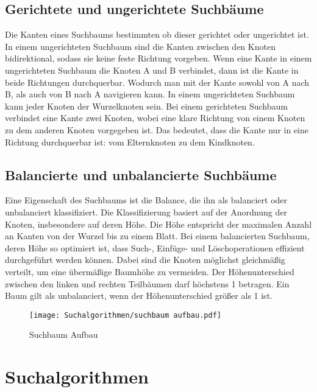 \subsection{Gerichtete und ungerichtete Suchb\"{a}ume} \label{gerichtete Graphen}
\label{chap:gerichtet und ungerichtete suchb\"{a}ume}

Die Kanten eines Suchbaums bestimmten ob dieser gerichtet oder ungerichtet ist. In einem ungerichteten Suchbaum sind die Kanten zwischen den Knoten bidirektional, sodass sie keine feste Richtung vorgeben. Wenn eine Kante in einem ungerichteten Suchbaum die Knoten A und B verbindet, dann ist die Kante in beide Richtungen durchquerbar. Wodurch man mit der Kante sowohl von A nach B, als auch von B nach A navigieren kann. In einem ungerichteten Suchbaum kann jeder Knoten der Wurzelknoten sein. Bei einem gerichteten Suchbaum verbindet eine Kante zwei Knoten, wobei eine klare Richtung von einem Knoten zu dem anderen Knoten vorgegeben ist. Das bedeutet, dass die Kante nur in eine Richtung durchquerbar ist: vom Elternknoten zu dem Kindknoten.

\subsection{Balancierte und unbalancierte Suchb\"{a}ume}
\label{chap:balancierte und unbalancierte suchb\"{a}ume}

Eine Eigenschaft des Suchbaums ist die Balance, die ihn als balanciert oder unbalanciert klassifiziert. Die Klassifizierung basiert auf der Anordnung der Knoten, insbesondere auf deren H\"{o}he. Die H\"{o}he entspricht der maximalen Anzahl an Kanten von der Wurzel bis zu einem Blatt. Bei einem balancierten Suchbaum, deren H\"{o}he so optimiert ist, dass Such-, Einf\"{u}ge- und L\"{o}schoperationen effizient durchgef\"{u}hrt werden k\"{o}nnen. Dabei sind die Knoten m\"{o}glichst gleichm\"{a}\ss{}ig verteilt, um eine \"{u}berm\"{a}\ss{}ige Baumh\"{o}he zu vermeiden. Der H\"{o}henunterschied zwischen den linken und rechten Teilb\"{a}umen darf h\"{o}chstens 1 betragen. Ein Baum gilt als unbalanciert, wenn der H\"{o}henunterschied gr\"{o}\ss{}er als 1 ist.

\begin{figure}[h]
  \centering
  \texttt{[image: Suchalgorithmen/suchbaum aufbau.pdf]}
	\captionsetup{justification=justified, format=plain}
  \caption{Suchbaum Aufbau}
  \label{fig:suchabaum aufbau}
\end{figure}

\section{Suchalgorithmen}
\label{chap:suchalgorithmen}

